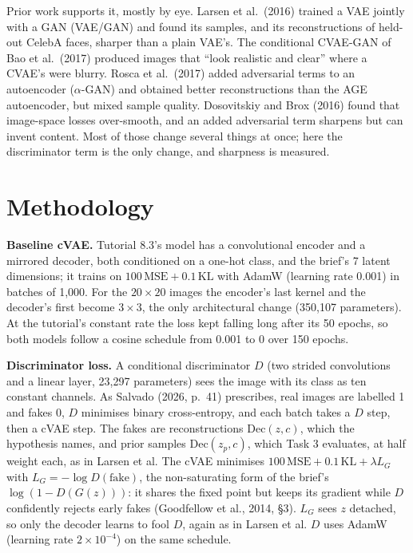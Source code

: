 \documentclass[10pt,a4paper,twocolumn]{article}
\begin{document}
Prior work supports it, mostly by eye. Larsen et al.\ (2016) trained a VAE jointly with a GAN
(VAE/GAN) and found its samples, and its reconstructions of held-out CelebA faces, sharper than a
plain VAE's. The conditional CVAE-GAN of Bao et al.\ (2017) produced images that ``look realistic
and clear'' where a CVAE's were blurry. Rosca et al.\ (2017) added adversarial terms to an
autoencoder ($\alpha$-GAN) and obtained better reconstructions than the AGE autoencoder, but
mixed sample quality. Dosovitskiy and Brox (2016) found that image-space losses
over-smooth, and an added adversarial term sharpens but can invent content. Most of those change
several things at once; here the discriminator term is the only change, and sharpness is measured.

\section{Methodology}
\textbf{Baseline cVAE.} Tutorial 8.3's model has a convolutional encoder and a mirrored decoder,
both conditioned on a one-hot class, and the brief's 7 latent dimensions; it trains on
$100\,\mathrm{MSE} + 0.1\,\mathrm{KL}$ with AdamW (learning rate 0.001) in batches of 1,000. For
the $20\times20$ images the encoder's last kernel and the decoder's first become $3\times3$, the
only architectural change (350,107 parameters). At the tutorial's constant rate the loss kept
falling long after its 50 epochs, so both models follow a cosine schedule from 0.001 to 0 over
150 epochs.

\textbf{Discriminator loss.} A conditional discriminator $D$ (two strided convolutions and a
linear layer, 23,297 parameters) sees the image with its class as ten constant channels. As
Salvado (2026, p.~41) prescribes, real images are labelled 1 and fakes 0, $D$ minimises binary
cross-entropy, and each batch takes a $D$ step, then a cVAE step. The fakes are reconstructions
$\mathrm{Dec}(z, c)$, which the hypothesis names, and prior samples $\mathrm{Dec}(z_p, c)$, which
Task 3 evaluates, at half weight each, as in Larsen et al. The cVAE minimises
$100\,\mathrm{MSE} + 0.1\,\mathrm{KL} + \lambda L_G$ with $L_G = -\log D(\mathrm{fake})$, the
non-saturating form of the brief's $\log(1 - D(G(z)))$: it shares the fixed point but keeps its
gradient while $D$ confidently rejects early fakes (Goodfellow et al., 2014, \S3). $L_G$ sees $z$
detached, so only the decoder learns to fool $D$, again as in Larsen et al. $D$ uses AdamW
(learning rate $2\times10^{-4}$) on the same schedule.
\end{document}
